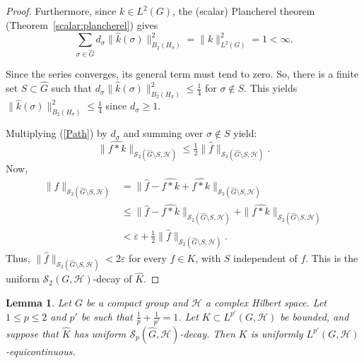 \documentclass[11pt]{amsart}
\newtheorem{lemma}[theorem]{Lemma}
\begin{document}
\begin{proof}
\noindent Furthermore, since $k\in L^2(G)$, the (scalar) Plancherel theorem (Theorem~\ref{scalar:plancherel}) gives
$$\sum_{\sigma\in \widehat{G}}
d_\sigma\|\widehat k(\sigma)\|_{B_2(H_\sigma)}^2=\|k\|_{L^2(G)}^2=1<\infty.$$


Since the series converges, its general term must tend to zero. So,  there is a finite set $S\subset\widehat{G}$ such that $d_\sigma\|\widehat k(\sigma)\|_{B_2(H_\sigma)}^2\le\frac{1}{4}$ for $\sigma\notin S$. This yields $\|\widehat k(\sigma)\|_{B_2(H_\sigma)}^2\le \frac{1}{4}$ since $d_\sigma\ge 1$. 

Multiplying (\ref{Path}) by
$d_\sigma$ and summing over $\sigma\notin S$ yield:
$$
\|\widehat{f*k}\|_{\mathscr{S}_2(\widehat{G}\setminus S,\mathcal{H})}\le\tfrac12\|\widehat f\|_{\mathscr{S}_2(\widehat{G}\setminus S,\mathcal{H})}.$$
Now, 
\begin{align*}
\|\widehat f\|_{\mathscr{S}_2(\widehat{G}\setminus S,\mathcal{H})}&=\|\widehat{f}-\widehat{f*k}+\widehat{f*k}\|_{\mathscr{S}_2(\widehat{G}\setminus S,\mathcal{H})}\\
&\le\|\widehat f-\widehat{f*k}\|_{\mathscr{S}_2(\widehat{G}\setminus S,\mathcal{H})}
+\|\widehat{f*k}\|_{\mathscr{S}_2(\widehat{G}\setminus S,\mathcal{H})}\\
&<\varepsilon +\frac{1}{2}\|\widehat f\|_{\mathscr{S}_2(\widehat{G}
\setminus S,\mathcal{H})}.
\end{align*}
Thus,  $\|\widehat f\|_{\mathscr{S}_2(\widehat{G}\setminus S,\mathcal{H})}<2\varepsilon$ for every $f\in K$, with $S$
independent of $f$. This is the uniform $\mathscr{S}_2(G,\mathcal{H})$-decay of $\widehat K$.
\end{proof}

\begin{lemma}\label{lem:equicont}
Let $G$ be a compact group and $\mathcal{H}$ a complex Hilbert space.  Let $1\le p\le 2$ and  $p'$ be such that $\frac{1}{p}+\frac{1}{p'}=1$.   Let $K\subset L^{p'}(G,\mathcal{H})$ be bounded,
and suppose that $\widehat K$ has uniform $\mathscr{S}_p(\widehat{G},\mathcal{H})$-decay. Then $K$ is uniformly
$L^{p'}(G,\mathcal{H})$-equicontinuous.
\end{lemma}
\end{document}

